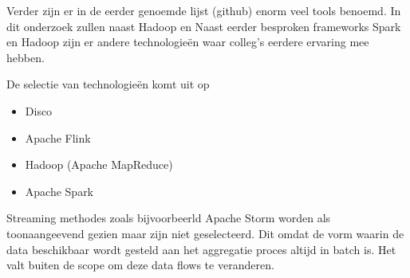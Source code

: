 Verder zijn er in de eerder genoemde lijst (github) enorm veel tools benoemd. In dit onderzoek zullen naast Hadoop en Naast eerder besproken frameworks Spark en Hadoop zijn er andere technologieën waar colleg's eerdere ervaring mee hebben.

De selectie van technologieën komt uit op

\begin{itemize}
    \item Disco
    \item Apache Flink
    \item Hadoop (Apache MapReduce)
    \item Apache Spark
\end{itemize}

Streaming methodes zoals bijvoorbeerld Apache Storm worden als toonaangeevend gezien maar zijn niet geselecteerd. Dit omdat de vorm waarin de data beschikbaar wordt gesteld aan het aggregatie proces altijd in batch is. Het valt buiten de scope om deze data flows te veranderen.